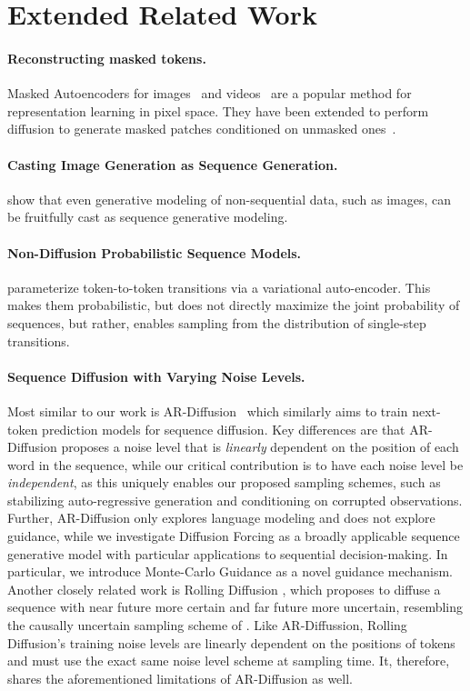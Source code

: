\section{Extended Related Work}\label{app:extended_related}


\paragraph{Reconstructing masked tokens.} Masked Autoencoders for images~\cite{he2022masked} and videos~\cite{feichtenhofer2022masked} are a popular method for representation learning in pixel space. They have been extended to perform diffusion to generate masked patches conditioned on unmasked ones~\cite{wei2023diffusion,gao2023masked}.

\paragraph{Casting Image Generation as Sequence Generation.} \cite{van2016conditional,chen2020generative} show that even generative modeling of non-sequential data, such as images, can be fruitfully cast as sequence generative modeling.

\paragraph{Non-Diffusion Probabilistic Sequence Models.}
\cite{chung2015recurrent} parameterize token-to-token transitions via a variational auto-encoder. This makes them probabilistic, but does not directly maximize the joint probability of sequences, but rather, enables sampling from the distribution of single-step transitions.

\paragraph{Sequence Diffusion with Varying Noise Levels.} Most similar to our work is AR-Diffusion~\cite{wu2023ardiffusion} which similarly aims to train next-token prediction models for sequence diffusion. Key differences are that AR-Diffusion proposes a noise level that is \emph{linearly} dependent on the position of each word in the sequence, while our critical contribution is to have each noise level be \emph{independent}, as this uniquely enables our proposed sampling schemes, such as stabilizing auto-regressive generation and conditioning on corrupted observations. Further, AR-Diffusion only explores language modeling and does not explore guidance, while we investigate Diffusion Forcing as a broadly applicable sequence generative model with particular applications to sequential decision-making. In particular, we introduce Monte-Carlo Guidance as a novel guidance mechanism. Another closely related work is Rolling Diffusion \cite{ruhe2024rolling}, which proposes to diffuse a sequence with near future more certain and far future more uncertain, resembling the causally uncertain sampling scheme of \algo. Like AR-Diffussion, Rolling Diffusion's training noise levels are linearly dependent on the positions of tokens and must use the exact same noise level scheme at sampling time. It, therefore, shares the aforementioned limitations of AR-Diffusion as well.
